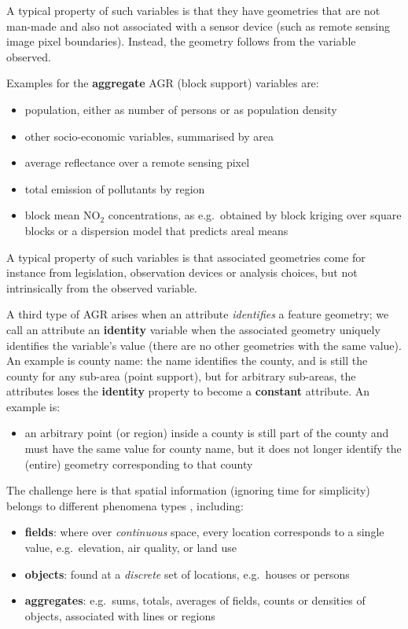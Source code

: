 \documentclass[]{book}
\providecommand{\tightlist}{%
  \setlength{\itemsep}{0pt}\setlength{\parskip}{0pt}}
\begin{document}
A typical property of such variables is that they have geometries
that are not man-made and also not associated with a sensor device
(such as remote sensing image pixel boundaries). Instead, the geometry
follows from the variable observed.

Examples for the \textbf{aggregate} AGR (block support) variables are:

\begin{itemize}
\tightlist
\item
  population, either as number of persons or as population density
\item
  other socio-economic variables, summarised by area
\item
  average reflectance over a remote sensing pixel
\item
  total emission of pollutants by region
\item
  block mean NO\(_2\) concentrations, as e.g.~obtained by block kriging
  over square blocks or a dispersion model that predicts areal means
\end{itemize}

A typical property of such variables is that associated geometries
come for instance from legislation, observation devices or analysis
choices, but not intrinsically from the observed variable.

A third type of AGR arises when an attribute \emph{identifies} a feature
geometry; we call an attribute an \textbf{identity} variable when
the associated geometry uniquely identifies the variable's value
(there are no other geometries with the same value). An example is
county name: the name identifies the county, and is still the county
for any sub-area (point support), but for arbitrary sub-areas, the
attributes loses the \textbf{identity} property to become a \textbf{constant}
attribute. An example is:

\begin{itemize}
\tightlist
\item
  an arbitrary point (or region) inside a county is still part of the
  county and must have the same value for county name, but it does not
  longer identify the (entire) geometry corresponding to that county
\end{itemize}

The challenge here is that spatial information (ignoring time for
simplicity) belongs to different phenomena types \citep[e.g.~][]{scheider2016},
including:

\begin{itemize}
\tightlist
\item
  \textbf{fields}: where over \emph{continuous} space, every location corresponds to a single value, e.g.~elevation, air quality, or land use
\item
  \textbf{objects}: found at a \emph{discrete} set of locations, e.g.~houses or persons
\item
  \textbf{aggregates}: e.g.~sums, totals, averages of fields, counts or densities of objects, associated with lines or regions
\end{itemize}
\end{document}
